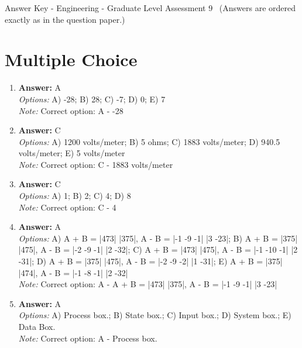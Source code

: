 \documentclass[12pt]{article}
\begin{document}
\begin{center}
Answer Key - Engineering - Graduate Level Assessment 9 \
\small (Answers are ordered exactly as in the question paper.)
\end{center}

\section*{Multiple Choice}
\begin{enumerate}[label=\arabic*.]
\item \textbf{Answer:} A
\\ \textit{Options:} A) -28; B) 28; C) -7; D) 0; E) 7
\\ \textit{Note:} Correct option: A - -28
\item \textbf{Answer:} C
\\ \textit{Options:} A) 1200 volts/meter; B) 5 ohms; C) 1883 volts/meter; D) 940.5 volts/meter; E) 5 volts/meter
\\ \textit{Note:} Correct option: C - 1883 volts/meter
\item \textbf{Answer:} C
\\ \textit{Options:} A) 1; B) 2; C) 4; D) 8
\\ \textit{Note:} Correct option: C - 4
\item \textbf{Answer:} A
\\ \textit{Options:} A) A + B = |473| |375|, A - B = |-1 -9 -1| |3 -23|; B) A + B = |375| |475|, A - B = |-2 -9 -1| |2 -32|; C) A + B = |473| |475|, A - B = |-1 -10 -1| |2 -31|; D) A + B = |375| |475|, A - B = |-2 -9 -2| |1 -31|; E) A + B = |375| |474|, A - B = |-1 -8 -1| |2 -32|
\\ \textit{Note:} Correct option: A - A + B = |473| |375|, A - B = |-1 -9 -1| |3 -23|
\item \textbf{Answer:} A
\\ \textit{Options:} A) Process box.; B) State box.; C) Input box.; D) System box.; E) Data Box.
\\ \textit{Note:} Correct option: A - Process box.
\end{enumerate}
\end{document}

